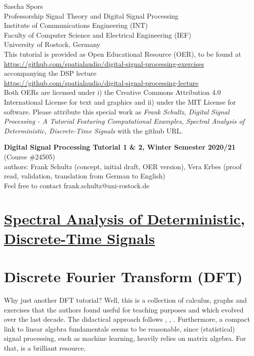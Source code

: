 \documentclass[11pt,a4paper,DIV=12]{scrartcl}
\begin{document}
{\raggedleft Sascha Spors\\
Professorship Signal Theory and Digital Signal Processing\\
Institute of Communications Engineering (INT)\\
Faculty of Computer Science and Electrical Engineering (IEF)\\
University of Rostock, Germany\\}
\vspace{0.5cm}
\noindent This tutorial is provided as Open Educational Resource (OER),
to be found at\\
\url{https://github.com/spatialaudio/digital-signal-processing-exercises}\\
accompanying the DSP lecture\\
\url{https://github.com/spatialaudio/digital-signal-processing-lecture}\\
Both OERs are licensed under i) the Creative Commons Attribution 4.0 International
License for text and graphics and ii) under the MIT License for software.
%
Please attribute this special work as
\textit{Frank Schultz, Digital Signal Processing - A
Tutorial Featuring Computational Examples, Spectral Analysis of Deterministic,
Discrete-Time Signals} with the github URL.
\newline

\textbf{Digital Signal Processing Tutorial 1 \& 2, Winter Semester 2020/21}
(Course \#24505)\\
authors: Frank Schultz (concept, initial draft, OER version),
Vera Erbes (proof read, validation, translation from German to English)\\
Feel free to contact frank.schultz@uni-rostock.de

\section*{\underline{Spectral Analysis of Deterministic, Discrete-Time Signals}}
\renewcommand{\contentsname}{}
\tableofcontents
\vspace{.7cm}

\section{Discrete Fourier Transform (DFT)}
Why just another DFT tutorial? Well, this is a collection of calculus,
graphs and exercises that the authors found useful for teaching purposes
and which evolved over the last decade.
%
The didactical approach follows \cite{Rabiner1975}, \cite{Kammeyer2002},
\cite{Moeser2011}.
%
Furthermore, a compact link to linear algebra fundamentals seems to be
reasonable, since (statistical) signal processing, such as machine learning,
heavily relies on matrix algebra. For that, \cite{Strang2019} is a brilliant
resource.
\end{document}
